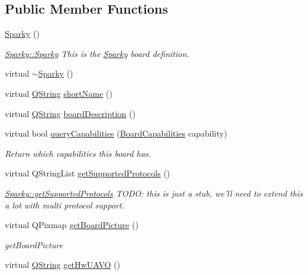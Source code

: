 \subsection*{\-Public \-Member \-Functions}
\begin{DoxyCompactItemize}
\item 
\hyperlink{group___boards___tau_labs_plugin_ga81d45abeade9a73a7d354c71e826e906}{\-Sparky} ()
\begin{DoxyCompactList}\small\item\em \hyperlink{group___boards___tau_labs_plugin_ga81d45abeade9a73a7d354c71e826e906}{\-Sparky\-::\-Sparky} \-This is the \hyperlink{class_sparky}{\-Sparky} board definition. \end{DoxyCompactList}\item 
virtual \hyperlink{group___boards___tau_labs_plugin_gafad187a9e7207b7b14ca0c71eaa7ad48}{$\sim$\-Sparky} ()
\item 
virtual \hyperlink{group___u_a_v_objects_plugin_gab9d252f49c333c94a72f97ce3105a32d}{\-Q\-String} \hyperlink{group___boards___tau_labs_plugin_gac9c737083d657f5a125688683f1adf88}{short\-Name} ()
\item 
virtual \hyperlink{group___u_a_v_objects_plugin_gab9d252f49c333c94a72f97ce3105a32d}{\-Q\-String} \hyperlink{group___boards___tau_labs_plugin_gad8873cb94f7f63588e8e88b20d511d76}{board\-Description} ()
\item 
virtual bool \hyperlink{group___boards___tau_labs_plugin_ga4b25de756ae522bc8ec649c4885a4e91}{query\-Capabilities} (\hyperlink{group___core_plugin_ga01b09218f2a13aaeee6db007ac6bd967}{\-Board\-Capabilities} capability)
\begin{DoxyCompactList}\small\item\em \-Return which capabilities this board has. \end{DoxyCompactList}\item 
virtual \-Q\-String\-List \hyperlink{group___boards___tau_labs_plugin_gae2df29177bbd9a5f916f60eeb6be284c}{get\-Supported\-Protocols} ()
\begin{DoxyCompactList}\small\item\em \hyperlink{group___boards___tau_labs_plugin_gae2df29177bbd9a5f916f60eeb6be284c}{\-Sparky\-::get\-Supported\-Protocols} \-T\-O\-D\-O\-: this is just a stub, we'll need to extend this a lot with multi protocol support. \end{DoxyCompactList}\item 
virtual \-Q\-Pixmap \hyperlink{group___boards___tau_labs_plugin_ga53e085a977e64c71dde6c29926cfa568}{get\-Board\-Picture} ()
\begin{DoxyCompactList}\small\item\em get\-Board\-Picture \end{DoxyCompactList}\item 
virtual \hyperlink{group___u_a_v_objects_plugin_gab9d252f49c333c94a72f97ce3105a32d}{\-Q\-String} \hyperlink{group___boards___tau_labs_plugin_ga20cbe067bab385a37bea66e2f97d8d7a}{get\-Hw\-U\-A\-V\-O} ()
\end{DoxyCompactItemize}


